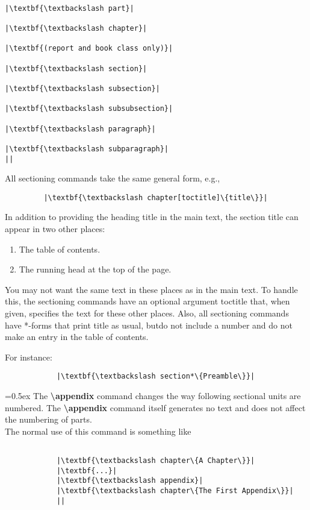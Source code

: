 \documentclass[12pt]{article}
\begin{document}
\begin{lstlisting}

|\textbf{\textbackslash part}|
            
|\textbf{\textbackslash chapter}|

|\textbf{(report and book class only)}|

|\textbf{\textbackslash section}|

|\textbf{\textbackslash subsection}|

|\textbf{\textbackslash subsubsection}|

|\textbf{\textbackslash paragraph}|

|\textbf{\textbackslash subparagraph}|
||
\end{lstlisting}

All sectioning commands take the same general form, e.g.,
\begin{lstlisting}
         |\textbf{\textbackslash chapter[toctitle]\{title\}}|
\end{lstlisting}
In addition to providing the heading title in the main text, the section title
can appear in two other places:
\begin{enumerate}
\item The table of contents.
\item The running head at the top of the page.
\end{enumerate} \par
You may not want the same text in these places as in the main text. To
handle this, the sectioning commands have an optional argument toctitle that,
when given, specifies the text for these other places.
\clearpage
{}
Also, all sectioning commands have *-forms that print title as usual, butdo
not include a number and do not make an entry in the table of contents. \\

\setlength{\parskip}{0.2em}

For instance:

\begin{lstlisting}
            |\textbf{\textbackslash section*\{Preamble\}}|
\end{lstlisting}

\font=0.5ex
The \textbf{\textbackslash appendix} command changes the way following sectional units are
numbered. The \textbf{\textbackslash appendix} command itself generates no text and does not affect the numbering of parts.\\

The normal use of this command is something like
\begin{lstlisting}

            |\textbf{\textbackslash chapter\{A Chapter\}}|
            |\textbf{...}|
            |\textbf{\textbackslash appendix}|
            |\textbf{\textbackslash chapter\{The First Appendix\}}|
            ||
            
\end{lstlisting}
\end{document}

